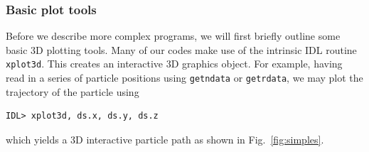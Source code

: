 \documentclass[a4paper,11pt,usenames,dvipsnames]{article}
\begin{document}
\subsubsection{Basic plot tools}
Before we describe more complex programs, we will first briefly outline some basic 3D plotting tools. Many of our codes make use of the intrinsic IDL routine \texttt{xplot3d}. This creates an interactive 3D graphics object. For example, having read in a series of particle positions using \texttt{getndata} or \texttt{getrdata}, we may plot the trajectory of the particle using 
\begin{verbatim}
IDL> xplot3d, ds.x, ds.y, ds.z
\end{verbatim}
which yields a 3D interactive particle path as shown in Fig.~\ref{fig:simples}.
 \begin{figure}[t]
   \centering

\end{figure}
\end{document}
